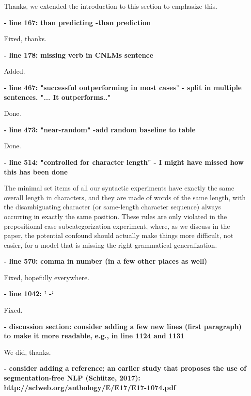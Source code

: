 \documentclass{article}[11pt,a4paper,oneside]
\begin{document}
Thanks, we extended the introduction to this section to emphasize this.\newline

\textbf{
- line 167: than predicting -than prediction}

Fixed, thanks.\newline

\textbf{
- line 178: missing verb in CNLMs sentence}

Added.\newline

\textbf{
- line 467: "successful outperforming in most cases" - split in multiple
sentences. "... It outperforms.."}

Done.\newline

\textbf{
- line 473: "near-random" -add random baseline to table}

Done.\newline

\textbf{
- line 514: "controlled for character length" - I might have missed how this
has been done}

The minimal set items of all our syntactic experiments have exactly the same overall length in characters, and they are made of words of the same length, with the disambiguating character (or same-length character sequence) always occurring in exactly the same position. These rules are only violated in the prepositional case subcategorization experiment, where, as we discuss in the paper, the potential confound should actually make things more difficult, not easier, for a model that is missing the right grammatical generalization. \newline

\textbf{
- line 570: comma in number (in a few other places as well)}

Fixed, hopefully everywhere.\newline

\textbf{
- line 1042: ' -`}

Fixed.\newline

\textbf{
- discussion section: consider adding a few new lines (first paragraph) to
make it more readable, e.g., in line 1124 and 1131}

We did, thanks.\newline

\textbf{
- consider adding a reference; an earlier study that proposes the use of
segmentation-free NLP (Schütze, 2017):
http://aclweb.org/anthology/E/E17/E17-1074.pdf}
\end{document}

